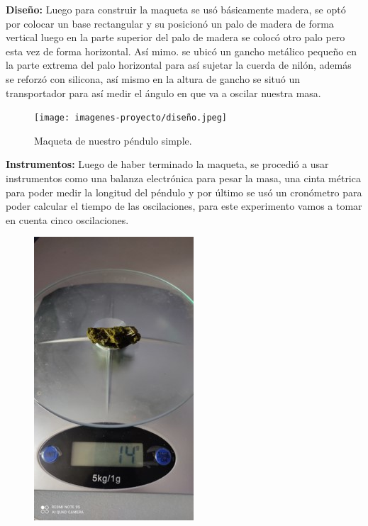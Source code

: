 \documentclass[10pt,a4paper]{article}
\begin{document}
\begin{multicols}{2}
{\textbf {Diseño:}} Luego para construir la  maqueta se usó básicamente madera, se optó por colocar un base rectangular y su posicionó un palo de madera de forma vertical luego en la parte superior del palo de madera se colocó otro palo pero esta vez de forma horizontal. Así mimo. se ubicó un gancho metálico pequeño en la parte extrema del palo horizontal para así sujetar la cuerda de nilón, además se reforzó con silicona, así mismo en la altura de gancho se situó un transportador para así medir el ángulo en que va a oscilar nuestra masa.
\begin{figure}[H]
	\centering
	\texttt{[image: imagenes-proyecto/diseño.jpeg]}
	\caption{Maqueta de nuestro péndulo simple.}
	\label{maqueta}
\end{figure}
 {\textbf {Instrumentos:}} Luego de haber terminado la maqueta, se procedió a usar instrumentos como una balanza electrónica para pesar la masa, una cinta métrica para poder medir la longitud del péndulo y por último se usó un cronómetro para poder calcular el tiempo de las oscilaciones, para este experimento vamos a tomar en cuenta cinco oscilaciones. \\
\begin{figure}[H]
	\raggedright
	\includegraphics[scale=0.4]{imagenes-proyecto/instrumento1.jpg}
	\raggedleft

\end{figure}
\end{multicols}
\end{document}

